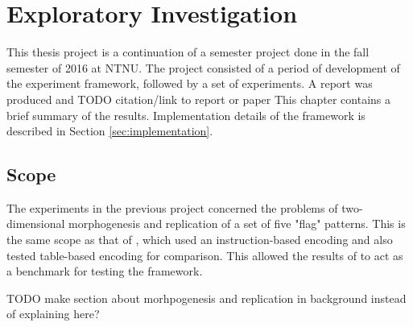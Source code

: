 \chapter{Exploratory Investigation}
This thesis project is a continuation of a semester project done in the fall semester of 2016 at NTNU.
The project consisted of a period of development of the experiment framework, followed by a set of experiments.
A report was produced and TODO citation/link to report or paper
This chapter contains a brief summary of the results.
Implementation details of the framework is described in Section \ref{sec:implementation}.


\section{Scope}
The experiments in the previous project concerned the problems of two-dimensional morphogenesis and replication of a set of five "flag" patterns.
This is the same scope as that of \cite{nichele2014evolutionary}, which used an instruction-based encoding and also tested table-based encoding for comparison.
This allowed the results of \cite{nichele2014evolutionary} to act as a benchmark for testing the framework.

TODO make section about morhpogenesis and replication in background instead of explaining here?


